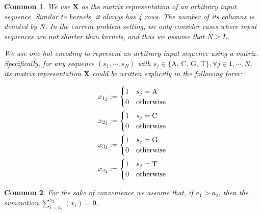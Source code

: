 \documentclass[12pt]{article}
\newcommand{\matrixSymbol}[1]{\mathbf{#1}}
\newtheorem{common}{Common}
\begin{document}
\begin{common}
We use $\matrixSymbol{X}$ as the matrix representation of an arbitrary input sequence. Similar to kernels, it always has 4 rows. The number of its columns is denoted by $N$. In the current problem setting, we only consider cases where input sequences are not shorter than kernels, and thus we assume that $N \ge L$.

We use one-hot encoding to represent an arbitrary input sequence using a matrix. Specifically, for any sequence $( s_1, \cdots, s_N ) $ with $ s_j \in \{\text{A, C, G, T}\}, \forall j \in 1, \cdots, N$, its matrix representation $\matrixSymbol{X}$ could be written explicitly in the following form:

\begin{align}
x_{1j} & := \begin{cases} 1 & s_j=\text{A} \\ 0 & \text{otherwise} \\ \end{cases} \notag \\
x_{2j} & := \begin{cases} 1 & s_j=\text{C} \\ 0 & \text{otherwise} \\ \end{cases} \\
x_{3j} & := \begin{cases} 1 & s_j=\text{G} \\ 0 & \text{otherwise} \\ \end{cases} \notag \\
x_{4j} & := \begin{cases} 1 & s_j=\text{T} \\ 0 & \text{otherwise} \\ \end{cases} \notag
\end{align}

\end{common}


\begin{common}
For the sake of convenience we assume that, if $a_1 > a_2$, then the summation $\sum_{i=a_1}^{a_2}{ \left( x_i \right)} = 0$.
\end{common}
\end{document}
